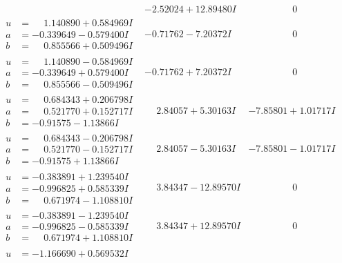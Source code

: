 \documentclass[1p]{elsarticle_modified}
\theoremstyle{definition}
\begin{document}
$$\begin{array}{c|c|c}
 & -2.52024 + 12.89480 I & \phantom{-0.000000 } 0 \\ \hline\begin{aligned}
u &= \phantom{-}1.140890 + 0.584969 I \\
a &= -0.339649 - 0.579400 I \\
b &= \phantom{-}0.855566 + 0.509496 I\end{aligned}
 & -0.71762 - 7.20372 I & \phantom{-0.000000 } 0 \\ \hline\begin{aligned}
u &= \phantom{-}1.140890 - 0.584969 I \\
a &= -0.339649 + 0.579400 I \\
b &= \phantom{-}0.855566 - 0.509496 I\end{aligned}
 & -0.71762 + 7.20372 I & \phantom{-0.000000 } 0 \\ \hline\begin{aligned}
u &= \phantom{-}0.684343 + 0.206798 I \\
a &= \phantom{-}0.521770 + 0.152717 I \\
b &= -0.91575 - 1.13866 I\end{aligned}
 & \phantom{-}2.84057 + 5.30163 I & -7.85801 + 1.01717 I \\ \hline\begin{aligned}
u &= \phantom{-}0.684343 - 0.206798 I \\
a &= \phantom{-}0.521770 - 0.152717 I \\
b &= -0.91575 + 1.13866 I\end{aligned}
 & \phantom{-}2.84057 - 5.30163 I & -7.85801 - 1.01717 I \\ \hline\begin{aligned}
u &= -0.383891 + 1.239540 I \\
a &= -0.996825 + 0.585339 I \\
b &= \phantom{-}0.671974 - 1.108810 I\end{aligned}
 & \phantom{-}3.84347 - 12.89570 I & \phantom{-0.000000 } 0 \\ \hline\begin{aligned}
u &= -0.383891 - 1.239540 I \\
a &= -0.996825 - 0.585339 I \\
b &= \phantom{-}0.671974 + 1.108810 I\end{aligned}
 & \phantom{-}3.84347 + 12.89570 I & \phantom{-0.000000 } 0 \\ \hline\begin{aligned}
u &= -1.166690 + 0.569532 I \\

\end{aligned}
\end{array}$$
\end{document}
